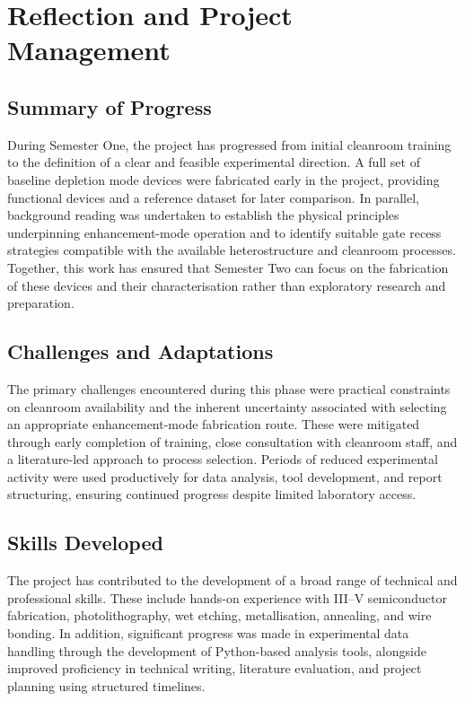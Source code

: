 \chapter{Reflection and Project Management}

\section{Summary of Progress}

During Semester One, the project has progressed from initial cleanroom
training to the definition of a clear and feasible experimental direction.
A full set of baseline depletion mode devices were fabricated early in the
project, providing functional devices and a reference dataset for later
comparison. In parallel, background reading was undertaken to establish
the physical principles underpinning enhancement-mode operation and to
identify suitable gate recess strategies compatible with the available
heterostructure and cleanroom processes. Together, this work has ensured
that Semester Two can focus on the fabrication of these devices and their
characterisation rather than exploratory research and preparation.

\section{Challenges and Adaptations}

The primary challenges encountered during this phase were practical
constraints on cleanroom availability and the inherent uncertainty
associated with selecting an appropriate enhancement-mode fabrication
route. These were mitigated through early completion of training,
close consultation with cleanroom staff, and a literature-led approach
to process selection. Periods of reduced experimental activity were
used productively for data analysis, tool development, and report
structuring, ensuring continued progress despite limited laboratory
access.

\section{Skills Developed}

The project has contributed to the development of a broad range of
technical and professional skills. These include hands-on experience
with III--V semiconductor fabrication, photolithography, wet etching,
metallisation, annealing, and wire bonding. In addition, significant
progress was made in experimental data handling through the development
of Python-based analysis tools, alongside improved proficiency in
technical writing, literature evaluation, and project planning using
structured timelines.

